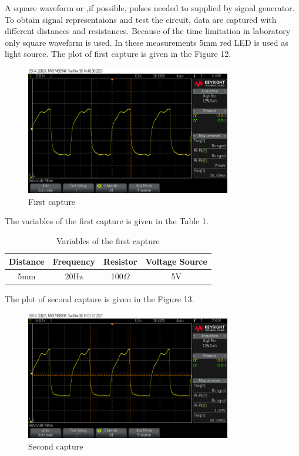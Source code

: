 \documentclass[letterpaper,12pt]{article}
\begin{document}
A square waveform or ,if possible, pulses needed to supplied by signal generator. 
To obtain signal representaions and test the circuit,  data are captured with different distances and resistances. Because of the time limitation in laboratory only square waveform is used. In these measurements 5mm red LED is used as light source.  
The plot of first capture is given in the Figure 12.
\begin{figure}[H]
	\centering
   \includegraphics[width=0.8\textwidth]{capture1_ss 0.png}
   \caption{First capture}
\end{figure} 
The variables of the first capture is given in the Table 1.
\begin{table}[H]
	\begin{center}
		\caption{Variables of the first capture}
		\vspace{2mm}
		\begin{tabular}{||c | c | c | c||} 
		 \hline
		 Distance & Frequency & Resistor & Voltage Source\\ [0.5ex] 
		 \hline\hline
		  5mm & 20Hz &  100\( \Omega \) & 5V  \\ 
		 \hline
		\end{tabular}
	\end{center}
	\end{table}
The plot of second capture is given in the Figure 13.
\begin{figure}[H]
	\centering
   \includegraphics[width=0.8\textwidth]{capture2_ss 0.png}
   \caption{Second capture}
\end{figure} 
\end{document}
